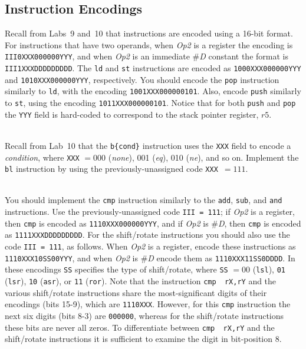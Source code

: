 \documentclass[epsfig,10pt,fullpage]{article} \addtolength{\textwidth}{1.5in}
\begin{document}
\subsection*{Instruction Encodings}
\noindent
Recall from Labs~9 and~10 that instructions are encoded using a 16-bit format. For instructions 
that have two operands, when {\it Op2} is a register the encoding is \texttt{III0XXX000000YYY}, 
and when {\it Op2} is an immediate \#{\it D} constant the format is \texttt{III1XXXDDDDDDDDD}. The
\texttt{ld} and \texttt{st} instructions are encoded as \texttt{1000XXX000000YYY} and
\texttt{1010XXX000000YYY}, respectively. You should encode the \texttt{pop} instruction 
similarly to \texttt{ld}, with the encoding \texttt{1001XXX000000101}. Also, encode 
\texttt{push} similarly to \texttt{st}, using the encoding \texttt{1011XXX000000101}.
Notice that for both \texttt{push} and \texttt{pop} the \texttt{YYY} field is hard-coded to 
correspond to the stack pointer register, $r5$. 

~\\
\noindent
Recall from Lab~10 that the \texttt{b\{cond\}} instruction uses the \texttt{XXX} field to
encode a {\it condition}, where \texttt{XXX} $= 000$ ({\it none}), 001 ({\it eq}), 010 
({\it ne}), and so on. Implement the \texttt{bl} instruction by using the previously-unassigned 
code \texttt{XXX}~$= 111$.   

~\\
\noindent
You should implement the \texttt{cmp} instruction similarly to the \texttt{add},
\texttt{sub}, and \texttt{and} instructions. Use the previously-unassigned code
\texttt{III = 111}; if {\it Op2} is a register, then \texttt{cmp} is encoded as
\texttt{1110XXX000000YYY}, and if {\it Op2} is \#{\it D}, then \texttt{cmp} is encoded 
as \texttt{1111XXXDDDDDDDDD}. For the shift/rotate instructions you should also use the
code \texttt{III = 111}, as follows. When {\it Op2} is a register, encode these
instructions as \texttt{1110XXX10SS00YYY}, and when {\it Op2} is \#{\it D} encode them as 
\texttt{1110XXX11SS0DDDD}. In these encodings \texttt{SS} specifies the type of
shift/rotate, where \texttt{SS} $= 00$ (\texttt{lsl}), \texttt{01} (\texttt{lsr}), 
\texttt{10} (\texttt{asr}), or \texttt{11} (\texttt{ror}). Note that the instruction 
\texttt{cmp~~rX,rY} and the various shift/rotate instructions share the most-significant
digits of their encodings (bits 15-9), which are \texttt{1110XXX}. However, for this 
\texttt{cmp} instruction the next six digits (bits 8-3) are \texttt{000000}, whereas for 
the shift/rotate instructions these bits are never all zeros. To differentiate between 
\texttt{cmp~~rX,rY} and the shift/rotate instructions it is sufficient to examine the digit in 
bit-position 8.
\end{document}
